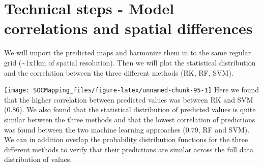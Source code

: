 \documentclass[10pt,b5paper,]{book}
\newenvironment{Shaded}{\begin{snugshade}}{\end{snugshade}}
\newcommand{\CommentTok}[1]{\textcolor[rgb]{0.56,0.35,0.01}{\textit{#1}}}
\newcommand{\DataTypeTok}[1]{\textcolor[rgb]{0.13,0.29,0.53}{#1}}
\newcommand{\KeywordTok}[1]{\textcolor[rgb]{0.13,0.29,0.53}{\textbf{#1}}}
\newcommand{\NormalTok}[1]{#1}
\newcommand{\OtherTok}[1]{\textcolor[rgb]{0.56,0.35,0.01}{#1}}
\newcommand{\StringTok}[1]{\textcolor[rgb]{0.31,0.60,0.02}{#1}}
\theoremstyle{definition}
\theoremstyle{definition}
\theoremstyle{definition}
\theoremstyle{remark}
\begin{document}
\hypertarget{technical-steps---model-correlations-and-spatial-differences}{%
\section{Technical steps - Model correlations and spatial
differences}\label{technical-steps---model-correlations-and-spatial-differences}}

We will import the predicted maps and harmonize them in to the same
regular grid (\textasciitilde{}1x1km of spatial resolution). Then we
will plot the statistical distribution and the correlation between the
three different methods (RK, RF, SVM).

\begin{Shaded}
\end{Shaded}

\texttt{[image: SOCMapping\_files/figure-latex/unnamed-chunk-95-1]}
Here we found that the higher correlation between predicted values was
between RK and SVM (0.86). We also found that the statistical
distribution of predicted values is quite similar between the three
methods and that the lowest correlation of predictions was found between
the two machine learning approaches (0.79, RF and SVM). We can in
addition overlap the probability distribution functions for the three
different methods to verify that their predictions are similar across
the full data distribution of values.
\end{document}
